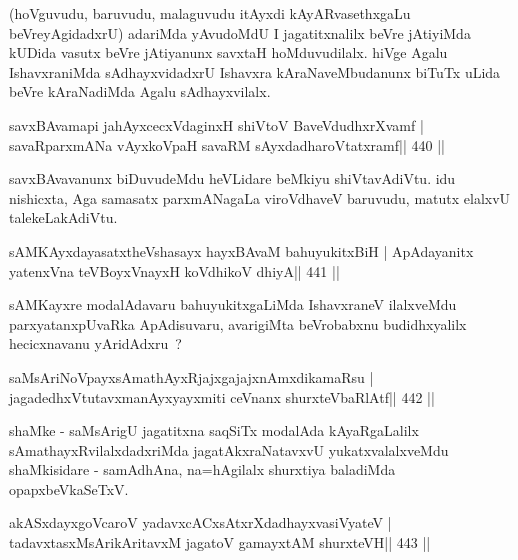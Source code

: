 \begin{artha}
(hoVguvudu, baruvudu, malaguvudu itAyxdi kAyARvasethxgaLu
  beVreyAgidadxrU) adariMda yAvudoMdU I jagatitxnalilx beVre jAtiyiMda
  kUDida vasutx beVre jAtiyanunx savxtaH hoMduvudilalx. hiVge Agalu
  IshavxraniMda sAdhayxvidadxrU Ishavxra kAraNaveMbudanunx biTuTx
  uLida beVre kAraNadiMda Agalu sAdhayxvilalx.
\end{artha}


\begin{shl}
savxBAvamapi ja{hAyx}cecxVdaginxH shiVtoV BaveVdudhxrXvamf |
savaRparxmANa vAyxkoVpaH savaRM sAyxdadharoVtatxramf\hfill || 440 ||
\end{shl}

\begin{artha}
savxBAvavanunx biDuvudeMdu heVLidare beMkiyu shiVtavAdiVtu. idu nishicxta, Aga samasatx parxmANagaLa viroVdhaveV baruvudu, matutx elalxvU talekeLakAdiVtu.
\end{artha}


\begin{shl}
sAMKAyxdayasatxtheVshasayx hayxBAvaM bahuyukitxBiH |
ApAdayanitx yatenxVna teVBoyxV\s nayxH koV\s dhikoV dhiyA\hfill || 441 ||
\end{shl}

\begin{artha}
sAMKayxre modalAdavaru bahuyukitxgaLiMda IshavxraneV ilalxveMdu
parxyatanxpUvaRka ApAdisuvaru, avarigiMta beVrobabxnu budidhxyalilx
hecicxnavanu yAridAdxru~?
\end{artha}


\begin{shl}
saMsAriNoV\s payxsAmathAyxRjajxgajajxnAmxdikamaRsu |
jagadedhxVtutavxmanAyxyayxmiti ceVnanx shurxteVbaRlAtf\hfill || 442 ||
\end{shl}

\begin{artha}
shaMke - saMsArigU jagatitxna saqSiTx modalAda kAyaRgaLalilx
sAmathayxRvilalxdadxriMda jagatAkxraNatavxvU yukatxvalalxveMdu
shaMkisidare - samAdhAna, na=hAgilalx shurxtiya baladiMda 
opapxbeVkaSeTxV.
\end{artha}

\begin{shl}
akASxdayxgoVcaroV yadavxcACxsAtxrXdadhayxvasiVyateV |
tadavxtasxMsArikAritavxM jagatoV gamayxtAM shurxteVH\hfill || 443 ||
\end{shl}

